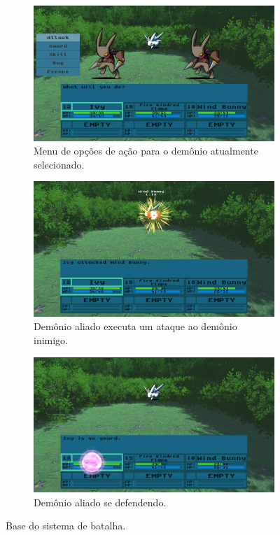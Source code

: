 \documentclass[
	12pt,				%
	openright,			%
	twoside,			%
	a4paper,			%
	english,			%
	french,				%
	spanish,			%
	brazil				%
	]{abntex2}
\begin{document}
\begin{figure}[h!]
  \centering
  \begin{subfigure}[b]{0.5\linewidth}
    \includegraphics[width=\linewidth]{options.jpg}
     \caption{Menu de opções de ação para o demônio atualmente selecionado.}
  \end{subfigure}
  \begin{subfigure}[b]{0.5\linewidth}
    \includegraphics[width=\linewidth]{attack.jpg}
    \caption{Demônio aliado executa um ataque ao demônio inimigo.}
  \end{subfigure}
  \begin{subfigure}[b]{0.5\linewidth}
    \includegraphics[width=\linewidth]{guard.jpg}
    \caption{Demônio aliado se defendendo.}
  \end{subfigure}
  \caption{Base do sistema de batalha.}
  \label{fig:battle}
\end{figure}
\end{document}
